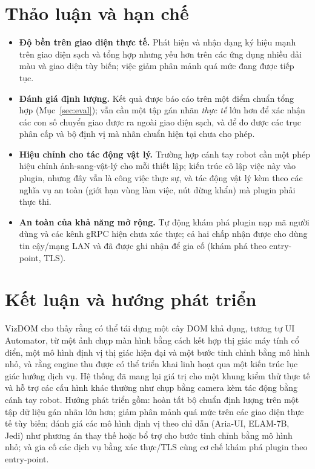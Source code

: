 \documentclass[11pt,a4paper]{article}
\begin{document}
\section{Thảo luận và hạn chế}
\begin{itemize}[leftmargin=1.4em]
  \item \textbf{Độ bền trên giao diện thực tế.} Phát hiện và nhận dạng ký hiệu mạnh
        trên giao diện sạch và tổng hợp nhưng yếu hơn trên các ứng dụng nhiều dải màu
        và giao diện tùy biến; việc giảm phân mảnh quá mức đang được tiếp tục.
  \item \textbf{Đánh giá định lượng.} Kết quả được báo cáo trên một điểm chuẩn tổng
        hợp (Mục~\ref{sec:eval}); vẫn cần một tập gán nhãn \emph{thực tế} lớn hơn để
        xác nhận các con số chuyển giao được ra ngoài giao diện sạch, và để đo được
        các trục phân cấp và bộ định vị mà nhãn chuẩn hiện tại chưa cho phép.
  \item \textbf{Hiệu chỉnh cho tác động vật lý.} Trường hợp cánh tay robot cần một
        phép hiệu chỉnh ảnh-sang-vật-lý cho mỗi thiết lập; kiến trúc cô lập việc này
        vào plugin, nhưng đây vẫn là công việc thực sự, và tác động vật lý kèm theo
        các nghĩa vụ an toàn (giới hạn vùng làm việc, nút dừng khẩn) mà plugin phải
        thực thi.
  \item \textbf{An toàn của khả năng mở rộng.} Tự động khám phá plugin nạp mã người
        dùng và các kênh gRPC hiện chưa xác thực; cả hai chấp nhận được cho dùng tin
        cậy/mạng LAN và đã được ghi nhận để gia cố (khám phá theo entry-point, TLS).
\end{itemize}

\section{Kết luận và hướng phát triển}
VizDOM cho thấy rằng có thể tái dựng một cây DOM khả dụng, tương tự UI Automator, từ
một ảnh chụp màn hình bằng cách kết hợp thị giác máy tính cổ điển, một mô hình định vị
thị giác hiện đại và một bước tinh chỉnh bằng mô hình nhỏ, và rằng engine thu được có
thể triển khai linh hoạt qua một kiến trúc lục giác hướng dịch vụ. Hệ thống đã mang
lại giá trị cho một khung kiểm thử thực tế và hỗ trợ các cấu hình khác thường như
chụp bằng camera kèm tác động bằng cánh tay robot. Hướng phát triển gồm: hoàn tất bộ
chuẩn định lượng trên một tập dữ liệu gán nhãn lớn hơn; giảm phân mảnh quá mức trên
các giao diện thực tế tùy biến; đánh giá các mô hình định vị theo chỉ dẫn (Aria-UI,
ELAM-7B, Jedi) như phương án thay thế hoặc bổ trợ cho bước tinh chỉnh bằng mô hình
nhỏ; và gia cố các dịch vụ bằng xác thực/TLS cùng cơ chế khám phá plugin theo
entry-point.



\end{document}
